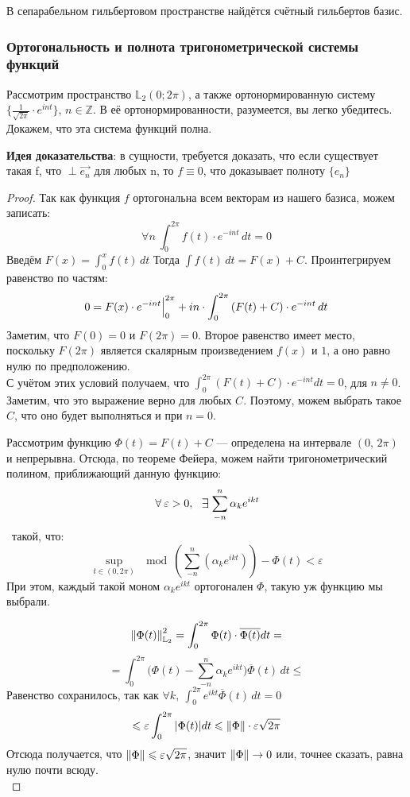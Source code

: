 \documentclass[12pt]{article}
\begin{document}
			\begin{state}
				В сепарабельном гильбертовом пространстве найдётся счётный гильбертов базис.
			\end{state}

		\subsubsection{Ортогональность и полнота тригонометрической системы функций}


			Рассмотрим пространство $\mathbb{L}_2 (0; 2\pi)$, а также ортонормированную систему $\{ \frac{1}{\sqrt{2\pi}} \cdot e^{int} \}$, $n \in \mathbb{Z}$. {\color{gray} В её ортонормированности, разумеется, вы легко убедитесь.} Докажем, что эта система функций полна.

			\textbf{Идея доказательства}: в сущности, требуется доказать, что если существует такая f, что
			$\perp \vec{e_n}$
			для любых n, то $f \equiv 0$, что доказывает полноту $\{ e_n \}$
			\begin{proof}
				Так как функция $f$ ортогональна всем векторам из нашего базиса, можем записать:
				$$ \forall n ~ \int_0^{2\pi} f(t) \cdot e^{-int} \,dt = 0 $$
				Введём $F(x) = \int_0^x f(t) \,dt$ Тогда $\int f(t) \,dt = F(x) + C$. Проинтегрируем равенство по частям:
				$$ 0 = F(x) \cdot e^{-int} \Big|_{0}^{2\pi} 
			   + i n \cdot \int_0^{2\pi} \left(F(t) + C\right) \cdot e^{-int} \,dt $$
				Заметим, что $F(0) = 0$ и $F(2\pi) = 0$. Второе равенство имеет место, поскольку $F(2\pi)$ является 
			    скалярным произведением $f(x)$ и $1$, а оно равно нулю по предположению. \\
				С учётом этих условий получаем, что $\int_0^{2\pi} (F(t) + C) \cdot e^{-int} dt = 0$, для $n \neq 0$.
				Заметим, что это выражение верно для любых $C$. Поэтому, можем выбрать такое $C$, что оно будет
				выполняться и при $n = 0$.

				Рассмотрим функцию $\Phi(t) = F(t) + C$ --- определена на интервале $(0,\, 2\pi)$ и непрерывна.
				Отсюда, по теореме Фейера, можем найти тригонометрический полином, приближающий данную функцию:
				$$\forall \varepsilon > 0,\, \:\Exists\! \sum_{-n}^n \alpha_k e^{ikt}$$\
				такой, что:
				$$ \underset{t \in (0,2\pi)}{\sup} \mod{(\sum_{-n}^n (\alpha_k e^{ikt})) - \Phi(t)} < \varepsilon $$
				При этом, каждый такой моном $\alpha_k e^{ikt}$ ортогонален $\Phi$, такую уж функцию мы выбрали.
		
				$$ \left\| \Phi(t) \right\|^2_{\mathbb{L}_2} = \int_0^{2\pi} \Phi(t) \cdot \overline{\Phi(t)} dt = $$
				$$ = \int_0^{2\pi}\Big(\Phi(t) - \sum_{-n}^n \alpha_k e^{ikt}\Big)\overline{\Phi}(t) \,dt \leq $$
				\todo{что-то странное, обосновать}
				Равенство сохранилось, так как $\forall k,\: \int_0^{2\pi}e^{ikt}\overline{\Phi}(t) \,dt = 0$
				$$ \leqslant \varepsilon \int_0^{2\pi} | \Phi(t) | dt \leqslant \left\| \Phi \right\| \cdot \varepsilon\sqrt{2\pi} $$
				Отсюда получается, что $\left\| \Phi \right\| \leqslant \varepsilon \sqrt{2\pi}$, значит $\left\| \Phi \right\| \rightarrow 0$ или, точнее сказать,
				равна нулю почти всюду.\\
			\end{proof}
	
\end{document}
